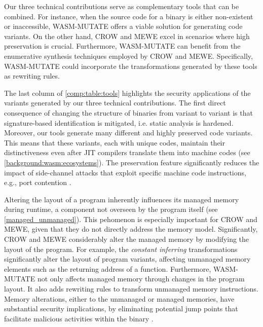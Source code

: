 \begin{tcolorbox}[title=Takeaway,boxrule=1pt,arc=.2em,boxsep=1.0mm]
    
    Our three technical contributions serve as complementary tools that can be combined.
    For instance, when the source code for a \Wasm binary is either non-existent or inaccessible, WASM-MUTATE offers a viable solution for generating code variants. 
    On the other hand, CROW and MEWE excel in scenarios where high preservation is crucial. Furthermore, WASM-MUTATE can benefit from the enumerative synthesis techniques employed by CROW and MEWE. 
    Specifically, WASM-MUTATE could incorporate the transformations generated by these tools as rewriting rules.
\end{tcolorbox}



The last column of \autoref{comp:table:tools} highlights the security applications of the variants generated by our three technical contributions.
The first direct consequence of changing the structure of \wasm binaries from variant to variant is that signature-based identification is mitigated, i.e. static analysis is hardened.
Moreover, our tools generate many different and highly preserved code variants. 
This means that these variants, each with unique \Wasm codes, maintain their distinctiveness even after JIT compilers translate them into machine codes (see \autoref{background:wasm:ecosystems}). 
The preservation feature significantly reduces the impact of side-channel attacks that exploit specific machine code instructions, e.g., port contention \cite{10.1145/3488932.3517411}.


Altering the layout of a \Wasm program inherently influences its managed memory during runtime, a component not overseen by the \Wasm program itself (see \autoref{managed_unmanaged}).
This pehomenon is especially important for CROW and MEWE, given that they do not directly address the \Wasm memory model.
Significantly, CROW and MEWE considerably alter the managed memory by modifying the layout of the \Wasm program.
For example, the \emph{constant inferring} transformations significantly alter the layout of program variants, affecting unmanaged memory elements such as the returning address of a function.
Furthermore, WASM-MUTATE not only affects managed memory through changes in the \Wasm program layout.
It also adds rewriting rules to transform unmanaged memory instructions.
Memory alterations, either to the unmanaged or managed memories, have substantial security implications, by eliminating potential jump points that facilitate malicious activities within the binary \cite{Swivel}.


